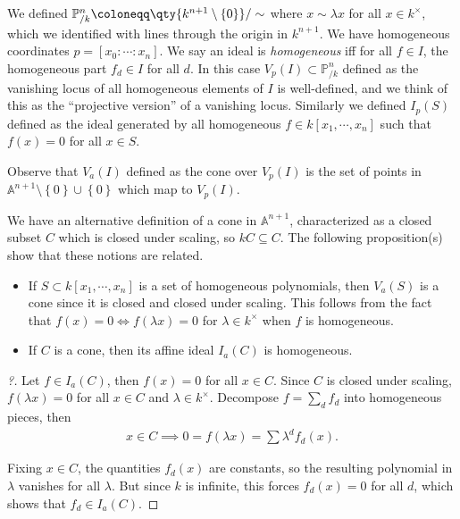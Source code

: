We defined
\({\mathbb{P}}^n_{/k} \coloneqq\qty{ k^{n+1}\setminus\left\{{0}\right\}} /\sim\)
where \(x\sim \lambda x\) for all \(x\in k^{\times}\), which we
identified with lines through the origin in \(k^{n+1}\). We have
homogeneous coordinates \(p = [x_0: \cdots : x_n]\). We say an ideal is
\emph{homogeneous} iff for all \(f\in I\), the homogeneous part
\(f_d\in I\) for all \(d\). In this case
\(V_p(I) \subset {\mathbb{P}}^{n}_{/k}\) defined as the vanishing locus
of all homogeneous elements of \(I\) is well-defined, and we think of
this as the ``projective version'' of a vanishing locus. Similarly we
defined \(I_p(S)\) defined as the ideal generated by all homogeneous
\(f\in k[x_1, \cdots, x_{n}]\) such that \(f(x) = 0\) for all
\(x\in S\).

\begin{remark}

Observe that \(V_a(I)\) defined as the cone over \(V_p(I)\) is the set
of points in
\({\mathbb{A}}^{n+1}\setminus\left\{{0}\right\}\cup\left\{{0}\right\}\)
which map to \(V_p(I)\).

\end{remark}

We have an alternative definition of a cone in \({\mathbb{A}}^{n+1}\),
characterized as a closed subset \(C\) which is closed under scaling, so
\(kC\subseteq C\). The following proposition(s) show that these notions
are related.

\begin{proposition}

\envlist

\begin{itemize}
\item
  If \(S\subset k[x_1, \cdots, x_{n}]\) is a set of homogeneous
  polynomials, then \(V_a(S)\) is a cone since it is closed and closed
  under scaling. This follows from the fact that
  \(f(x) = 0 \iff f(\lambda x) = 0\) for \(\lambda \in k^{\times}\) when
  \(f\) is homogeneous.
\item
  If \(C\) is a cone, then its affine ideal \(I_a(C)\) is homogeneous.
\end{itemize}

\end{proposition}

\begin{proof}[?]

Let \(f\in I_a(C)\), then \(f(x) = 0\) for all \(x\in C\). Since \(C\)
is closed under scaling, \(f(\lambda x) = 0\) for all \(x\in C\) and
\(\lambda \in k^{\times}\). Decompose \(f = \sum_d f_d\) into
homogeneous pieces, then
\begin{align*}  
x\in C \implies 0 = f(\lambda x) = \sum \lambda^d f_d(x) 
.\end{align*}

Fixing \(x\in C\), the quantities \(f_d(x)\) are constants, so the
resulting polynomial in \(\lambda\) vanishes for all \(\lambda\). But
since \(k\) is infinite, this forces \(f_d(x) = 0\) for all \(d\), which
shows that \(f_d \in I_a(C)\).

\end{proof}

